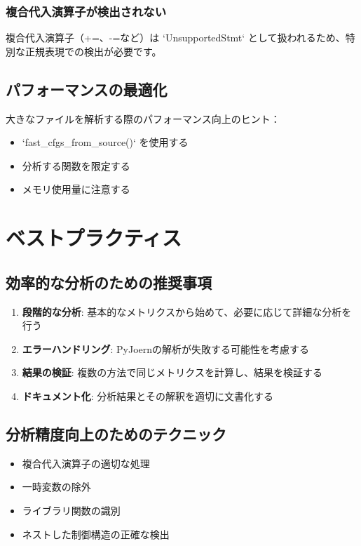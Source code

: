 \documentclass[12pt,a4paper]{article}
\begin{document}
\subsubsection{複合代入演算子が検出されない}

複合代入演算子（+=、-=など）は `UnsupportedStmt` として扱われるため、特別な正規表現での検出が必要です。

\subsection{パフォーマンスの最適化}

大きなファイルを解析する際のパフォーマンス向上のヒント：

\begin{itemize}
    \item `fast_cfgs_from_source()` を使用する
    \item 分析する関数を限定する
    \item メモリ使用量に注意する
\end{itemize}

\section{ベストプラクティス}

\subsection{効率的な分析のための推奨事項}

\begin{enumerate}
    \item \textbf{段階的な分析}: 基本的なメトリクスから始めて、必要に応じて詳細な分析を行う
    \item \textbf{エラーハンドリング}: PyJoernの解析が失敗する可能性を考慮する
    \item \textbf{結果の検証}: 複数の方法で同じメトリクスを計算し、結果を検証する
    \item \textbf{ドキュメント化}: 分析結果とその解釈を適切に文書化する
\end{enumerate}

\subsection{分析精度向上のためのテクニック}

\begin{itemize}
    \item 複合代入演算子の適切な処理
    \item 一時変数の除外
    \item ライブラリ関数の識別
    \item ネストした制御構造の正確な検出
\end{itemize}
\end{document}
